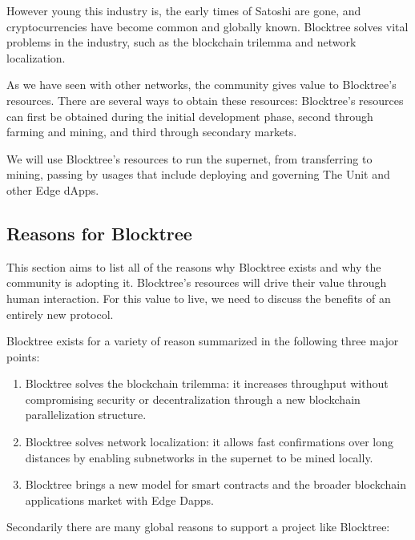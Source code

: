 \documentclass[12pt]{article}
\begin{document}
However young this industry is, the early times of Satoshi are gone, and cryptocurrencies have become common and globally known. Blocktree solves vital problems in the industry, such as the blockchain trilemma and network localization. 

As we have seen with other networks, the community gives value to Blocktree's resources. There are several ways to obtain these resources: Blocktree's resources can first be obtained during the initial development phase, second through farming and mining, and third through secondary markets. 

We will use Blocktree's resources to run the supernet, from transferring to mining, passing by usages that include deploying and governing The Unit and other Edge dApps.


\subsection{Reasons for Blocktree}

This section aims to list all of the reasons why Blocktree exists and why the community is adopting it. Blocktree's resources will drive their value through human interaction. For this value to live, we need to discuss the benefits of an entirely new protocol.

Blocktree exists for a variety of reason summarized in the following three major points:

\begin{enumerate}

\item Blocktree solves the blockchain trilemma: it increases throughput without compromising security or decentralization through a new blockchain parallelization structure.

\item Blocktree solves network localization: it allows fast confirmations over long distances by enabling subnetworks in the supernet to be mined locally. 

\item Blocktree brings a new model for smart contracts and the broader blockchain applications market with Edge Dapps.

\end{enumerate}

Secondarily there are many global reasons to support a project like Blocktree:
\end{document}
